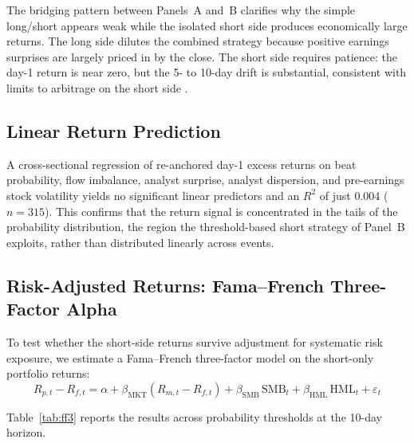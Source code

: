 \documentclass[11pt]{article}
\begin{document}
The bridging pattern between Panels~A and~B clarifies why the simple long/short appears weak while the isolated short side produces economically large returns. The long side dilutes the combined strategy because positive earnings surprises are largely priced in by the close. The short side requires patience: the day-1 return is near zero, but the 5- to 10-day drift is substantial, consistent with limits to arbitrage on the short side \citep{shleifer1997limits}.

\subsection{Linear Return Prediction}

A cross-sectional regression of re-anchored day-1 excess returns on beat probability, flow imbalance, analyst surprise, analyst dispersion, and pre-earnings stock volatility yields no significant linear predictors and an $R^2$ of just 0.004 ($n = 315$). This confirms that the return signal is concentrated in the tails of the probability distribution, the region the threshold-based short strategy of Panel~B exploits, rather than distributed linearly across events.

\subsection{Risk-Adjusted Returns: Fama--French Three-Factor Alpha}

To test whether the short-side returns survive adjustment for systematic risk exposure, we estimate a Fama--French three-factor model \citep{fama1993common} on the short-only portfolio returns:
\begin{equation}
R_{p,t} - R_{f,t} = \alpha + \beta_{\text{MKT}} (R_{m,t} - R_{f,t}) + \beta_{\text{SMB}} \, \text{SMB}_t + \beta_{\text{HML}} \, \text{HML}_t + \varepsilon_t
\end{equation}

Table~\ref{tab:ff3} reports the results across probability thresholds at the 10-day horizon.
\end{document}
